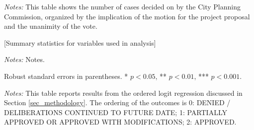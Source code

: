 \documentclass[12pt,english,hyperfootnotes=false,hidelinks]{article}
\begin{document}
\pagebreak


\begin{table}[H]
\caption{Summary of Motion Outcomes and Vote Results}
\vspace{0.2cm}
\label{tab_result_unanimity}
\begin{adjustbox}{max width=\textwidth}
\begin{threeparttable}

\begin{tablenotes}

\item {\textit{Notes: } This table shows the number of cases decided on by the City Planning Commission, organized by the implication of the motion for the project proposal and the unanimity of the vote.}
\end{tablenotes}
\end{threeparttable}
\end{adjustbox}
\end{table}

\pagebreak

\begin{table}[H]
\caption{Summary Statistics for Case Features}
\vspace{0.2cm}
\label{tab_summary_stats}
\begin{adjustbox}{max width=\textwidth}
\begin{threeparttable}
\begin{center}
[Summary statistics for variables used in analysis]
\end{center}
\begin{tablenotes}
\item {\textit{Notes: } Notes.}
\end{tablenotes}
\end{threeparttable}
\end{adjustbox}
\end{table}

\pagebreak

\begin{table}[H]
  \caption{Ordered Logit Regression Results}
  \vspace{0.2cm}
  \label{tab_ologit_results}
  \begin{adjustbox}{max width=\textwidth}
    \begin{threeparttable}
      \centering
      
        \begin{tablenotes}[flushleft]
        \footnotesize
        \item Robust standard errors in parentheses. * $p<0.05$, ** $p<0.01$, *** $p<0.001$.
        \item \textit{Notes:} This table reports results from the ordered logit regression 
        discussed in Section \ref{sec_methodology}. The ordering of the outcomes is 
        0: DENIED / DELIBERATIONS CONTINUED TO FUTURE DATE; 
        1: PARTIALLY APPROVED OR APPROVED WITH MODIFICATIONS; 
        2: APPROVED.
      \end{tablenotes}
    \end{threeparttable}
  \end{adjustbox}
\end{table}
\end{document}
